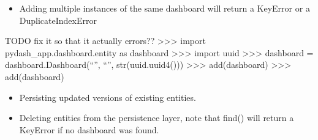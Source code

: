 \documentclass[letterpaper,10pt,english]{sphinxmanual}
\begin{document}
%
\begin{sphinxVerbatim}[commandchars=\\\{\}]
\end{sphinxVerbatim}
\begin{itemize}
\item {} 
Adding multiple instances of the same dashboard will return a KeyError or a DuplicateIndexError

\end{itemize}

TODO fix it so that it actually errors??
\textgreater{}\textgreater{}\textgreater{} import pydash\_app.dashboard.entity as dashboard
\textgreater{}\textgreater{}\textgreater{} import uuid
\textgreater{}\textgreater{}\textgreater{} dashboard = dashboard.Dashboard(“”, “”, str(uuid.uuid4()))
\textgreater{}\textgreater{}\textgreater{} add(dashboard)
\textgreater{}\textgreater{}\textgreater{} add(dashboard)
\begin{itemize}
\item {} 
Persisting updated versions of existing entities.

\end{itemize}

%
\begin{sphinxVerbatim}[commandchars=\\\{\}]
   
 
    
  
  
  
\end{sphinxVerbatim}
\begin{itemize}
\item {} 
Deleting entities from the persistence layer, note that find() will return a KeyError if no dashboard was found.

\end{itemize}
\end{document}
